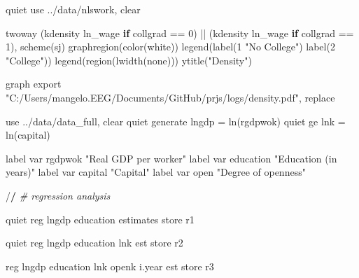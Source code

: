 \documentclass[
  12pt,
]{article}
\newenvironment{Shaded}{\begin{snugshade}}{\end{snugshade}}
\newcommand{\CommentTok}[1]{\textcolor[rgb]{0.56,0.35,0.01}{\textit{#1}}}
\newcommand{\ControlFlowTok}[1]{\textcolor[rgb]{0.13,0.29,0.53}{\textbf{#1}}}
\newcommand{\DecValTok}[1]{\textcolor[rgb]{0.00,0.00,0.81}{#1}}
\newcommand{\ErrorTok}[1]{\textcolor[rgb]{0.64,0.00,0.00}{\textbf{#1}}}
\newcommand{\FunctionTok}[1]{\textcolor[rgb]{0.00,0.00,0.00}{#1}}
\newcommand{\NormalTok}[1]{#1}
\newcommand{\OtherTok}[1]{\textcolor[rgb]{0.56,0.35,0.01}{#1}}
\newcommand{\SpecialCharTok}[1]{\textcolor[rgb]{0.00,0.00,0.00}{#1}}
\newcommand{\StringTok}[1]{\textcolor[rgb]{0.31,0.60,0.02}{#1}}
\begin{document}
\begin{Shaded}
\begin{Highlighting}[]
\NormalTok{quiet use ..}\SpecialCharTok{/}\NormalTok{data}\SpecialCharTok{/}\NormalTok{nlswork, clear}

\FunctionTok{twoway}\NormalTok{ (kdensity ln\_wage }\ControlFlowTok{if}\NormalTok{ collgrad }\SpecialCharTok{==} \DecValTok{0}\NormalTok{) }\SpecialCharTok{||}\NormalTok{ (kdensity ln\_wage }\ControlFlowTok{if}\NormalTok{ collgrad }\SpecialCharTok{==} \DecValTok{1}\NormalTok{), }\FunctionTok{scheme}\NormalTok{(sj) }\FunctionTok{graphregion}\NormalTok{(}\FunctionTok{color}\NormalTok{(white)) }\FunctionTok{legend}\NormalTok{(}\FunctionTok{label}\NormalTok{(}\DecValTok{1} \StringTok{"No College"}\NormalTok{) }\FunctionTok{label}\NormalTok{(}\DecValTok{2} \StringTok{"College"}\NormalTok{)) }\FunctionTok{legend}\NormalTok{(}\FunctionTok{region}\NormalTok{(}\FunctionTok{lwidth}\NormalTok{(none))) }\FunctionTok{ytitle}\NormalTok{(}\StringTok{"Density"}\NormalTok{)}

\NormalTok{graph export }\StringTok{"C:/Users/mangelo.EEG/Documents/GitHub/prjs/logs/density.pdf"}\NormalTok{, replace}

\NormalTok{use ..}\SpecialCharTok{/}\NormalTok{data}\SpecialCharTok{/}\NormalTok{data\_full, clear}
\NormalTok{        quiet generate lngdp }\OtherTok{=} \FunctionTok{ln}\NormalTok{(rgdpwok)}
\NormalTok{        quiet ge lnk }\OtherTok{=} \FunctionTok{ln}\NormalTok{(capital)}

\NormalTok{        label var rgdpwok }\StringTok{"Real GDP per worker"}
\NormalTok{        label var education }\StringTok{"Education (in years)"}
\NormalTok{        label var capital }\StringTok{"Capital"}
\NormalTok{        label var open }\StringTok{"Degree of openness"}

\SpecialCharTok{/}\ErrorTok{/} \CommentTok{\# regression analysis}

\NormalTok{    quiet reg lngdp education}
\NormalTok{        estimates store r1}

\NormalTok{    quiet reg lngdp education lnk}
\NormalTok{        est store r2}

\NormalTok{    reg lngdp education lnk openk i.year}
\NormalTok{        est store r3}


\end{Highlighting}
\end{Shaded}
\end{document}
